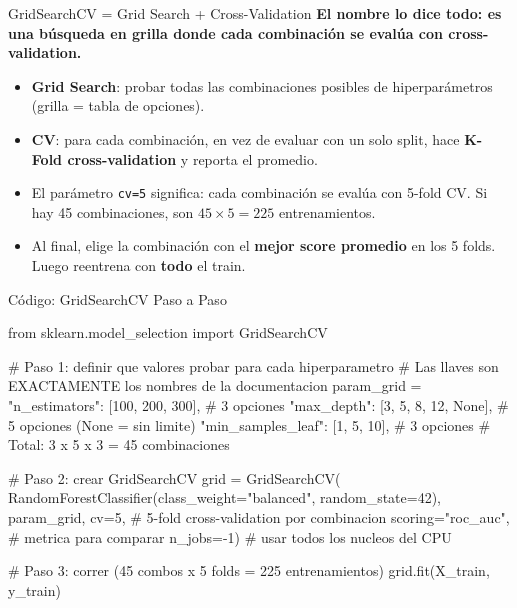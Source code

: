 \documentclass[aspectratio=169, 11pt]{beamer}
\begin{document}
\begin{frame}{GridSearchCV = Grid Search + Cross-Validation}
  \vspace{-4pt}
  {\footnotesize\color{arcaDark}\bfseries
    El nombre lo dice todo: es una \textbf{búsqueda en grilla} donde
    cada combinación se evalúa con \textbf{cross-validation}.}

  \vspace{6pt}
  {\footnotesize
  \begin{itemize}\setlength{\itemsep}{5pt}
    \item[{\color{arcaRed}\scriptsize\faArrowRight}]
      \textbf{Grid Search}: probar todas las combinaciones posibles de
      hiperparámetros (grilla = tabla de opciones).
    \item[{\color{arcaRed}\scriptsize\faArrowRight}]
      \textbf{CV}: para cada combinación, en vez de evaluar con un solo
      split, hace \textbf{K-Fold cross-validation} y reporta el promedio.
    \item[{\color{arcaRed}\scriptsize\faArrowRight}]
      El parámetro \texttt{cv=5} significa: cada combinación se evalúa
      con 5-fold CV. Si hay 45 combinaciones, son $45 \times 5 = 225$
      entrenamientos.
    \item[{\color{codeGreen}\scriptsize\faArrowRight}]
      Al final, elige la combinación con el \textbf{mejor score promedio}
      en los 5 folds. Luego reentrena con \textbf{todo} el train.
  \end{itemize}
  }
\end{frame}

\begin{frame}[fragile,shrink=22]{Código: GridSearchCV Paso a Paso}
  \vspace{-6pt}
  \begin{pyblock}
from sklearn.model_selection import GridSearchCV

# Paso 1: definir que valores probar para cada hiperparametro
# Las llaves son EXACTAMENTE los nombres de la documentacion
param_grid = {
    "n_estimators": [100, 200, 300],   # 3 opciones
    "max_depth": [3, 5, 8, 12, None],  # 5 opciones (None = sin limite)
    "min_samples_leaf": [1, 5, 10],    # 3 opciones
}
# Total: 3 x 5 x 3 = 45 combinaciones

# Paso 2: crear GridSearchCV
grid = GridSearchCV(
    RandomForestClassifier(class_weight="balanced", random_state=42),
    param_grid,
    cv=5,               # 5-fold cross-validation por combinacion
    scoring="roc_auc",  # metrica para comparar
    n_jobs=-1)           # usar todos los nucleos del CPU

# Paso 3: correr (45 combos x 5 folds = 225 entrenamientos)
grid.fit(X_train, y_train)
  \end{pyblock}
\end{frame}
\end{document}
